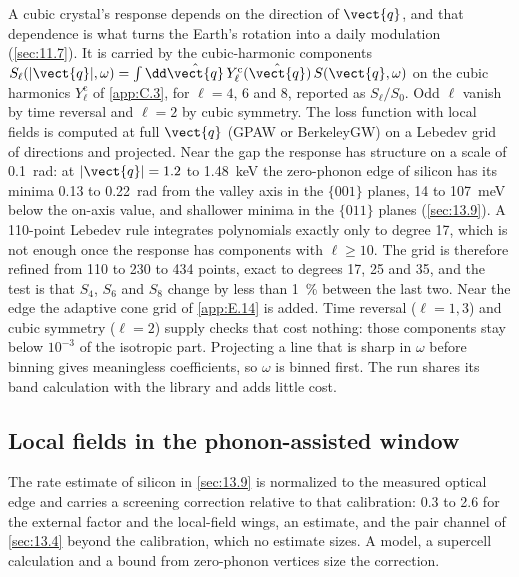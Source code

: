 A cubic crystal's response depends on the direction of $\vect{q}$, and that dependence is what turns the Earth's rotation into a daily modulation (\cref{sec:11.7}). It is carried by the cubic-harmonic components $S_\ell(|\vect{q}|,\omega) = \int\dd\hat{\vect{q}}\,Y^{\mathrm{c}}_\ell(\hat{\vect{q}})\,S(\vect{q},\omega)$ on the cubic harmonics $Y^{\mathrm{c}}_\ell$ of \cref{app:C.3}, for $\ell = 4$, 6 and 8, reported as $S_\ell/S_0$. Odd $\ell$ vanish by time reversal and $\ell = 2$ by cubic symmetry. The loss function with local fields is computed at full $\vect{q}$ (GPAW or BerkeleyGW) on a Lebedev grid of directions and projected. Near the gap the response has structure on a scale of \SI{0.1}{rad}: at $|\vect{q}| = 1.2$ to \SI{1.48}{keV} the zero-phonon edge of silicon has its minima 0.13 to \SI{0.22}{rad} from the valley axis in the $\{001\}$ planes, 14 to \SI{107}{meV} below the on-axis value, and shallower minima in the $\{011\}$ planes (\cref{sec:13.9}). A 110-point Lebedev rule integrates polynomials exactly only to degree 17, which is not enough once the response has components with $\ell \ge 10$. The grid is therefore refined from 110 to 230 to 434 points, exact to degrees 17, 25 and 35, and the test is that $S_4$, $S_6$ and $S_8$ change by less than \SI{1}{\percent} between the last two. Near the edge the adaptive cone grid of \cref{app:E.14} is added. Time reversal ($\ell = 1, 3$) and cubic symmetry ($\ell = 2$) supply checks that cost nothing: those components stay below $10^{-3}$ of the isotropic part. Projecting a line that is sharp in $\omega$ before binning gives meaningless coefficients, so $\omega$ is binned first. The run shares its band calculation with the library and adds little cost.

\subsection{Local fields in the phonon-assisted window}

The rate estimate of silicon in \cref{sec:13.9} is normalized to the measured optical edge and carries a screening correction relative to that calibration: 0.3 to 2.6 for the external factor and the local-field wings, an estimate, and the pair channel of \cref{sec:13.4} beyond the calibration, which no estimate sizes. A model, a supercell calculation and a bound from zero-phonon vertices size the correction.

